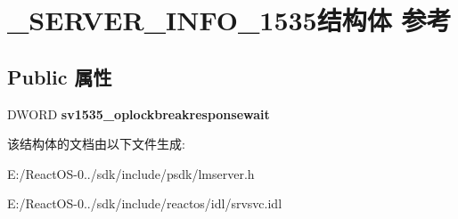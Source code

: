 \hypertarget{struct___s_e_r_v_e_r___i_n_f_o__1535}{}\section{\+\_\+\+S\+E\+R\+V\+E\+R\+\_\+\+I\+N\+F\+O\+\_\+1535结构体 参考}
\label{struct___s_e_r_v_e_r___i_n_f_o__1535}
\subsection*{Public 属性}
\begin{DoxyCompactItemize}
\item 
\mbox{\label{struct___s_e_r_v_e_r___i_n_f_o__1535_afbebbfa9845d9f45732dd25b554b3a33}} 
D\+W\+O\+RD {\bfseries sv1535\+\_\+oplockbreakresponsewait}
\end{DoxyCompactItemize}


该结构体的文档由以下文件生成\+:\begin{DoxyCompactItemize}
\item 
E\+:/\+React\+O\+S-\/0../sdk/include/psdk/lmserver.\+h\item 
E\+:/\+React\+O\+S-\/0../sdk/include/reactos/idl/srvsvc.\+idl\end{DoxyCompactItemize}
